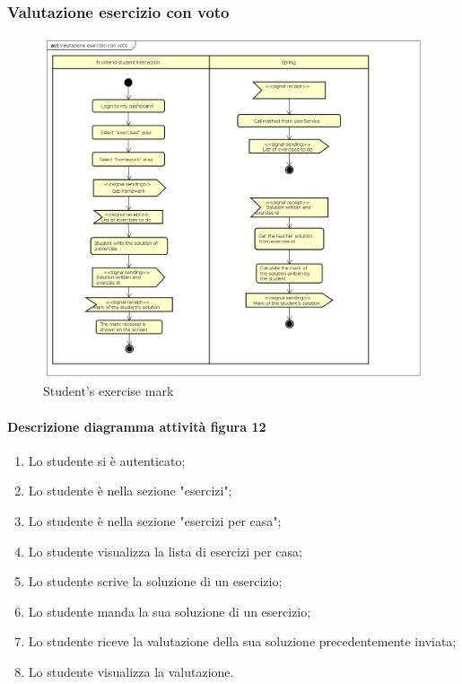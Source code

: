 \subsubsection{Valutazione esercizio con voto}
\begin{figure}[H]
\centering
\includegraphics[width=17cm, keepaspectratio]{img/Student-exercise-mark.png} 
\caption{Student's exercise mark}
\end{figure}

\paragraph{Descrizione diagramma attività figura 12}
\begin{enumerate}
\item Lo studente si è autenticato;
\item Lo studente è nella sezione "esercizi"; 
\item Lo studente è nella sezione "esercizi per casa";
\item Lo studente visualizza la lista di esercizi per casa; 
\item Lo studente scrive la soluzione di un esercizio;
\item Lo studente manda la sua soluzione di un esercizio; 
\item Lo studente riceve la valutazione della sua soluzione precedentemente inviata; 
\item Lo studente visualizza la valutazione.
\end{enumerate}


